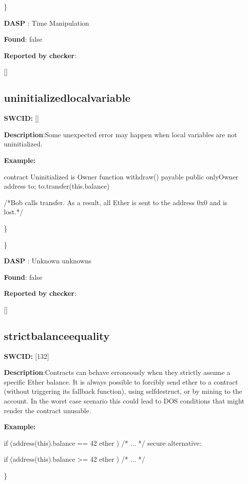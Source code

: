 \documentclass{article}
\begin{document}
\} 

\textbf{DASP} : Time Manipulation

\textbf{Found}: false

\textbf{Reported by checker}: 
\begin{ffcode} 

[]
\end{ffcode} 
\subsection{uninitialized{\textunderscore}local{\textunderscore}variable} 
\textbf{SWC{\textunderscore}ID:} []

\textbf{Description}:Some unexpected error may happen when local variables are not uninitialized.


\textbf{Example:} 
\begin{ffcode} 

contract Uninitialized is Owner{
    function withdraw() payable public onlyOwner{
        address to;
        to.transfer(this.balance)
    }
}

 /*Bob calls transfer. As a result, all Ether is sent to the address 0x0 and is lost.*/ 

\end{ffcode} 
\} 

\} 

\textbf{DASP} : Unknown unknowns

\textbf{Found}: false

\textbf{Reported by checker}: 
\begin{ffcode} 

[]
\end{ffcode} 
\subsection{strict{\textunderscore}balance{\textunderscore}equality} 
\textbf{SWC{\textunderscore}ID:} [132]

\textbf{Description}:Contracts can behave erroneously when they strictly assume a specific Ether balance. It is always possible to forcibly send ether to a contract (without triggering its fallback function), using selfdestruct, or by mining to the account. In the worst case scenario this could lead to DOS conditions that might render the contract unusable.


\textbf{Example:} 
\begin{ffcode} 

if (address(this).balance == 42 ether ) {
    /* ... */
}
 secure alternative:

if (address(this).balance >= 42 ether ) {
  /* ... */
}

\end{ffcode} 
\} 
\end{document}
